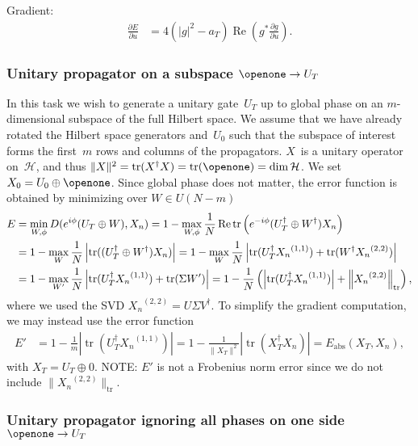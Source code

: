 \documentclass[aps, pra, a4paper, longbibliography, superscriptaddress]{revtex4-1}
\newcommand{\I}{\openone}
\newcommand{\hilb}[1]{\mathcal{#1}}
\DeclareMathOperator{\tr}{tr}
\DeclareMathOperator{\re}{Re}
\newcommand{\Xt}{X_T}  %
\newcommand{\Xo}{X_0}  %
\newcommand{\Xn}{X_n}  %
\newcommand{\dd}[2]{\frac{\partial #1}{\partial #2}}
\begin{document}
Gradient:
\begin{align}
\dd{E}{u}
&=
4 \left(\left|g\right|^2 -a_T \right) \re \left(g^* \dd{g}{u}\right).
\end{align}


\subsubsection{Unitary propagator on a subspace $\I \to U_T$}
\label{sec:closed-u-sub}
In this task we wish to generate a unitary gate~$U_T$ up to global
phase on an $m$-dimensional subspace of the full Hilbert space.
We assume that we have already rotated the Hilbert space generators and~$U_0$ such that
the subspace of interest forms the first~$m$ rows and columns of the propagators.
$X$~is a unitary operator on~$\hilb{H}$, and
thus $\|X\|^2 = \tr(X^\dagger X) = \tr(\I) = \dim \hilb{H}$.
We set $\Xo = U_0 \oplus \I$.
Since global phase does not matter, the error function is
obtained by minimizing over $W \in U(N-m)$
\begin{align}
\notag
E
&= \min_{W, \phi} D(e^{i \phi} (U_T \oplus W), \Xn)
= 1 -\max_{W, \phi} \frac{1}{N} \re \tr \left(e^{-i \phi} (U_T^\dagger \oplus W^\dagger) \Xn\right)\\
\notag
&= 1 -\max_{W} \frac{1}{N} \left|\tr ((U_T^\dagger \oplus W^\dagger) \Xn)\right|
= 1 -\max_{W} \frac{1}{N} \left|\tr (U_T^\dagger {\Xn}^{(1,1)}) +\tr (W^\dagger {\Xn}^{(2,2)})\right|\\
&= 1 -\max_{W'} \frac{1}{N} \left|\tr (U_T^\dagger {\Xn}^{(1,1)}) +\tr (\Sigma W')\right|
= 1 -\frac{1}{N} \left(\left|\tr (U_T^\dagger {\Xn}^{(1,1)})\right| +\left\|{\Xn}^{(2,2)}\right\|_{\tr} \right),
\end{align}
where we used the SVD ${\Xn}^{(2,2)} = U \Sigma V^\dagger$.
To simplify the gradient computation, we may instead use the error function
\begin{align}
E'
&=
1 -\frac{1}{m} \left|\tr (U_T^\dagger {\Xn}^{(1,1)})\right|
= 1 -\frac{1}{\|\Xt\|^2} \left|\tr (\Xt^\dagger \Xn)\right|
= E_\text{abs}(\Xt, \Xn),
\end{align}
with $\Xt = U_T \oplus 0$.
NOTE: $E'$ is not a Frobenius norm error since we do not include $\|{\Xn}^{(2,2)}\|_{\tr}$.


\subsubsection{Unitary propagator ignoring all phases on one side $\I \to U_T$}
\end{document}
